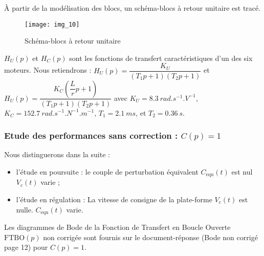 \ifprof
\begin{corrige}
\end{corrige}
\else
\fi


\ifprof
\begin{corrige}
\end{corrige}
\else
\fi


À partir de la modélisation des blocs, un schéma-blocs à retour unitaire est tracé.

\begin{figure}[H]
\centering
\texttt{[image: img\_10]}
\caption{Schéma-blocs à retour unitaire\label{img:10}}
\end{figure}

$H_U( p)$ et $H_C( p)$ sont les fonctions de transfert caractéristiques d’un des six moteurs. Nous retiendrons :
$H_U(p)=\dfrac{K_U}{\left(T_1p +1\right)\left(T_2p +1\right)}$ et $H_U(p)=\dfrac{K_C\left(\dfrac{L}{r}p +1\right)}{\left(T_1p +1\right)\left(T_2p +1\right)}$
avec 
$K_U = \SI{8,3}{rad . s ^{-1}.V ^{-1}}$, 
$K_C = \SI{152,7}{rad . s^{-1}.N^{-1} .m^{-1}}$, 
$T_1=\SI{2,1}{ms}$, 
et $T_2 =\SI{0,36}{s}$.

\subsubsection{Etude des performances sans correction : $C( p) =1$}
Nous distinguerons dans la suite :
\begin{itemize}
\item l’étude en poursuite : le couple de perturbation équivalent $C_{\text{equ}} (t)$ est nul $V_c (t)$ varie ;
\item l’étude en régulation : La vitesse de consigne de la plate-forme $V_c (t)$ est nulle. $C_{\text{equ}}(t)$ varie.
\end{itemize}

Les diagrammes de Bode de la Fonction de Transfert en Boucle Ouverte $\text{FTBO}( p)$ non corrigée sont fournis sur le document-réponse (Bode non corrigé page 12) pour $C( p) = 1$.

